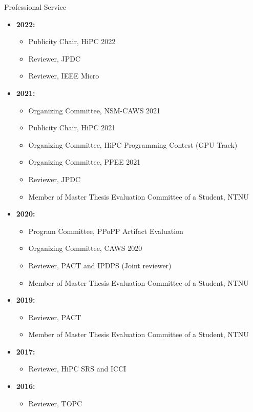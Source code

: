 \documentclass{resume} %
\begin{document}
\begin{rSection}{Professional Service}
\begin{itemize}
	\item \textbf{2022:}
	\begin{itemize}		
		\item Publicity Chair, HiPC 2022
		\item Reviewer, JPDC
		\item Reviewer, IEEE Micro
	\end{itemize}
	\item \textbf{2021:}
	\begin{itemize}
		\item Organizing Committee, NSM-CAWS 2021		
		\item Publicity Chair, HiPC 2021
		\item Organizing Committee, HiPC Programming Contest (GPU Track)
		\item Organizing Committee, PPEE 2021
		\item Reviewer, JPDC
		\item Member of Master Thesis Evaluation Committee of a Student, NTNU
	\end{itemize}
	\item \textbf{2020:}
	\begin{itemize}
		\item Program Committee, PPoPP Artifact Evaluation
		\item Organizing Committee, CAWS 2020
		\item Reviewer, PACT and IPDPS (Joint reviewer)
		\item Member of Master Thesis Evaluation Committee of a Student, NTNU
	\end{itemize}
	\item  \textbf{2019:}
	\begin{itemize}
		\item Reviewer, PACT
		\item Member of Master Thesis Evaluation Committee of a Student, NTNU
	\end{itemize}
	\item  \textbf{2017:}
	\begin{itemize}
		\item Reviewer, HiPC SRS and ICCI
	\end{itemize}
	\item  \textbf{2016:}
	\begin{itemize}
		\item Reviewer, TOPC
	\end{itemize}
\end{itemize}
\end{rSection}
\end{document}
